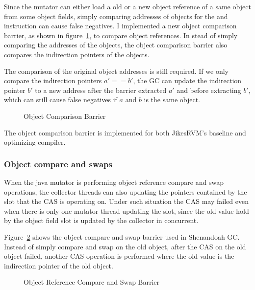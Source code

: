 Since the mutator can either load a old or a new object reference of a same object
from some object fields, simply comparing addresses of objects for the  and 
instruction can cause false negatives. I implemented a new object comparison barrier,
as shown in figure~\ref{fig:objectcomparisonbarrier}, to compare object references.
In stead of simply comparing the addresses of the objects, the object comparison barrier also
compares the indirection pointers of the objects.

The comparison of the original object addresses is still required. If we only compare the
indirection pointers $a' == b'$, the GC can update the indirection pointer $b'$ to a new
address after the barrier extracted $a'$ and before extracting $b'$, which can still cause false
negatives if $a$ and $b$ is the same object.

\begin{figure}
  \centering
  
  \caption{Object Comparison Barrier}
  \label{fig:objectcomparisonbarrier}
\end{figure}

The object comparison barrier is implemented for both JikesRVM's baseline and optimizing compiler.

\subsubsection{Object compare and swaps}

When the java mutator is performing object reference compare and swap operations,
the collector threads can also updating the pointers contained by the slot that the CAS
is operating on. Under such situation the CAS may failed even when there is only one mutator
thread updating the slot, since the old value hold by the object field slot is updated
by the collector in concurrent.

Figure~\ref{fig:objectcasbarrier} shows the object compare and swap barrier used in Shenandoah GC.
Instead of simply compare and swap on the old object, after the CAS on the old object failed,
another CAS operation is performed where the old value is the indirection pointer of the old object.

\begin{figure}
  \centering
  
  \caption{Object Reference Compare and Swap Barrier} 
  \label{fig:objectcasbarrier}
\end{figure}

